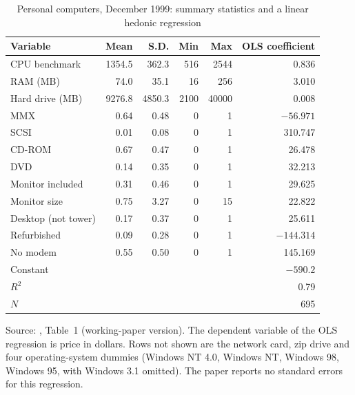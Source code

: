 \begin{table}[htbp]
\centering
\caption{Personal computers, December 1999: summary statistics and a linear hedonic regression}
\label{tab:06-bb-data}
\small
\begin{tabular}{@{}lrrrrr@{}}
\toprule
Variable & Mean & S.D. & Min & Max & OLS coefficient \\
\midrule
CPU benchmark          & 1354.5 & 362.3 & 516 & 2544 & 0.836 \\
RAM (MB)               & 74.0 & 35.1 & 16 & 256 & 3.010 \\
Hard drive (MB)        & 9276.8 & 4850.3 & 2100 & 40000 & 0.008 \\
MMX                    & 0.64 & 0.48 & 0 & 1 & $-56.971$ \\
SCSI                   & 0.01 & 0.08 & 0 & 1 & 310.747 \\
CD-ROM                 & 0.67 & 0.47 & 0 & 1 & 26.478 \\
DVD                    & 0.14 & 0.35 & 0 & 1 & 32.213 \\
Monitor included       & 0.31 & 0.46 & 0 & 1 & 29.625 \\
Monitor size           & 0.75 & 3.27 & 0 & 15 & 22.822 \\
Desktop (not tower)    & 0.17 & 0.37 & 0 & 1 & 25.611 \\
Refurbished            & 0.09 & 0.28 & 0 & 1 & $-144.314$ \\
No modem               & 0.55 & 0.50 & 0 & 1 & 145.169 \\
\midrule
Constant               & & & & & $-590.2$ \\
$R^2$                  & & & & & 0.79 \\
$N$                    & & & & & 695 \\
\bottomrule
\end{tabular}

\smallskip
\begin{minipage}{0.85\textwidth}
\footnotesize Source: \citet{BajariBenkard2005}, Table~1 (working-paper version). The dependent variable of the OLS
regression is price in dollars. Rows not shown are the network card, zip drive and four operating-system dummies (Windows NT
4.0, Windows NT, Windows 98, Windows 95, with Windows 3.1 omitted). The paper reports no standard errors for this regression.
\end{minipage}
\end{table}

